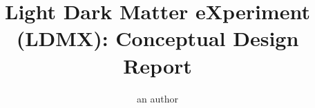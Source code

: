 \documentclass[11pt]{article}
\begin{document}

% 
%
\title{Light Dark Matter eXperiment (LDMX):  Conceptual Design Report}

\author[a]{an author}


\maketitle





\clearpage


\clearpage


\clearpage


\clearpage


%
%
\end{document}
